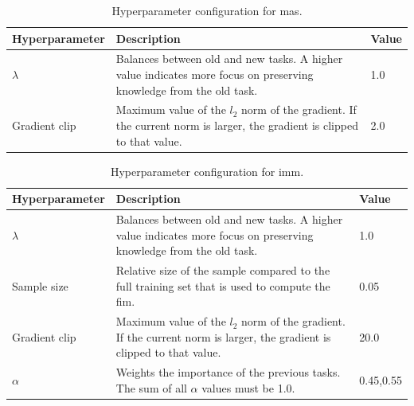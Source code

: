 \begin{table}[!htb]
    \begin{tabularx}{\textwidth}{| l | X | l |} 
        \hline
        Hyperparameter & Description & Value \\ 
        \hline 
        \hline
        $\lambda$ & Balances between old and new tasks. A higher value indicates more focus
        on preserving knowledge \newline from the old task. & 1.0  \\ 
        \hline
        Gradient clip & Maximum value of the $l_2$ norm of the gradient. If the current norm is larger, the
        gradient is clipped to that value. & 2.0 \\ 
        \hline
    \end{tabularx}
    \caption{Hyperparameter configuration for \gls{mas}.}
    \label{fig:MASparams}
\end{table}

\begin{table}[!htb]
    \begin{tabularx}{\textwidth}{| l | X | l |} 
        \hline
        Hyperparameter & Description & Value \\ 
        \hline 
        \hline
        $\lambda$ & Balances between old and new tasks. A higher value indicates more focus
        on preserving knowledge from the old task. & 1.0  \\ 
        \hline
        Sample size & Relative size of the sample compared to the full training set that is used to 
        compute the \gls{fim}. & 0.05  \\ 
        \hline
        Gradient clip & Maximum value of the $l_2$ norm of the gradient. If the current norm is larger, the
        gradient is clipped to that value. & 20.0 \\ 
        \hline
        $\alpha$ & Weights the importance of the previous tasks. The sum of all $\alpha$ values must be 1.0. & 0.45,0.55 \\
        \hline
    \end{tabularx}
    \caption{Hyperparameter configuration for \gls{imm}.}
    \label{fig:IMMparams}
\end{table}

